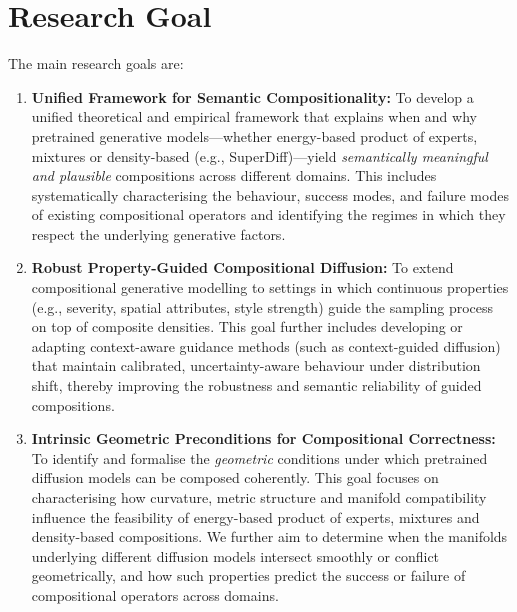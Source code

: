 \section{Research Goal}
\label{sec:research_objectives_research_goal}

The main research goals are:

\begin{enumerate}
    \item \textbf{Unified Framework for Semantic Compositionality:} 
    To develop a unified theoretical and empirical framework that explains 
    when and why pretrained generative models---whether energy-based product of experts, mixtures or density-based (e.g., SuperDiff)---yield 
    \emph{semantically meaningful and plausible} compositions across 
    different domains.  
    This includes systematically characterising the behaviour, success 
    modes, and failure modes of existing compositional operators and 
    identifying the regimes in which they respect the underlying 
    generative factors.

    \item \textbf{Robust Property-Guided Compositional Diffusion:}
    To extend compositional generative modelling to settings in which 
    continuous properties (e.g., severity, spatial attributes, style 
    strength) guide the sampling process on top of composite densities.  
    This goal further includes developing or adapting 
    context-aware guidance methods (such as context-guided diffusion) 
    that maintain calibrated, uncertainty-aware behaviour under 
    distribution shift, thereby improving the robustness and semantic 
    reliability of guided compositions.

    \item \textbf{Intrinsic Geometric Preconditions for Compositional Correctness:}
    To identify and formalise the \emph{geometric} conditions under which
    pretrained diffusion models can be composed coherently. This goal focuses on
    characterising how curvature, metric structure and manifold compatibility influence the feasibility of energy-based product of experts, mixtures
    and density-based compositions. We further aim to determine when the
    manifolds underlying different diffusion models intersect smoothly or conflict geometrically, and how
    such properties predict the success or failure of compositional operators
    across domains.
\end{enumerate}